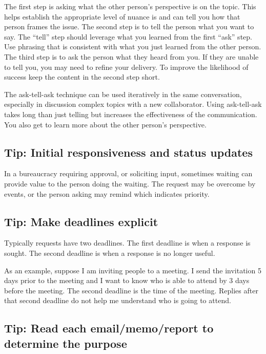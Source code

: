 The first step is asking what the other person's perspective is on the topic. This helps establish the appropriate level of nuance is and can tell you how that person frames the issue. The second step is to tell the person what you want to say. The ``tell'' step should leverage what you learned from the first ``ask'' step. Use phrasing that is consistent with what you just learned from the other person. The third step is to ask the person what they heard from you. If they are unable to tell you, you may need to refine your delivery. To improve the likelihood of success keep the content in the second step short. 

The ask-tell-ask technique can be used iteratively in the same conversation, especially in discussion complex topics with a new collaborator. Using ask-tell-ask takes long than just telling but increases the effectiveness of the communication. You also get to learn more about the other person's perspective. 


\subsection*{Tip: Initial responsiveness and status updates}
In a bureaucracy requiring approval, or soliciting input, sometimes waiting can provide value to the person doing the waiting. The request may be overcome by events, or the person asking may remind which indicates priority.

\subsection*{Tip: Make deadlines explicit}

Typically requests have two deadlines. The first deadline is when a response is sought. The second deadline is when a response is no longer useful.  

As an example, suppose I am inviting people to a meeting. I send the invitation 5 days prior to the meeting and I want to know who is able to attend by 3 days before the meeting. The second deadline is the time of the meeting. Replies after that second deadline do not help me understand who is going to attend. 

\subsection*{Tip: Read each email/memo/report to determine the purpose }

